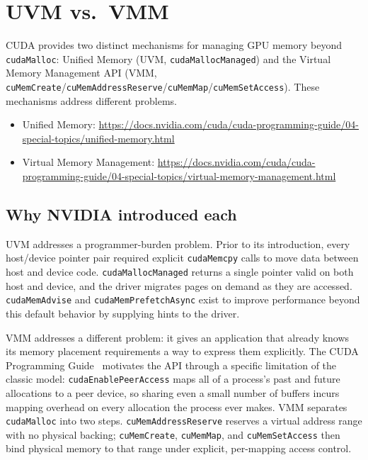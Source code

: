 \section{UVM vs.\ VMM}
\label{sec:uvm-vs-vmm}

CUDA provides two distinct mechanisms for managing GPU memory beyond
\texttt{cudaMalloc}: Unified Memory (UVM, \texttt{cudaMallocManaged}) and the
Virtual Memory Management API (VMM,
\texttt{cuMemCreate}/\texttt{cuMemAddressReserve}/\texttt{cuMemMap}/\texttt{cuMemSetAccess}).
These mechanisms address different problems.

\begin{itemize}
  \item Unified Memory:
    \url{https://docs.nvidia.com/cuda/cuda-programming-guide/04-special-topics/unified-memory.html}
  \item Virtual Memory Management:
    \url{https://docs.nvidia.com/cuda/cuda-programming-guide/04-special-topics/virtual-memory-management.html}
\end{itemize}

\subsection{Why NVIDIA introduced each}

UVM addresses a programmer-burden problem. Prior to its introduction, every
host/device pointer pair required explicit \texttt{cudaMemcpy} calls to move
data between host and device code. \texttt{cudaMallocManaged} returns a
single pointer valid on both host and device, and the driver migrates pages
on demand as they are accessed. \texttt{cudaMemAdvise} and
\texttt{cudaMemPrefetchAsync} exist to improve performance beyond this
default behavior by supplying hints to the driver.

VMM addresses a different problem: it gives an application that already
knows its memory placement requirements a way to express them explicitly.
The CUDA Programming Guide~\citep{cuda_programming_guide} motivates the API through a specific limitation
of the classic model: \texttt{cudaEnablePeerAccess} maps all of a process's
past and future allocations to a peer device, so sharing even a small number
of buffers incurs mapping overhead on every allocation the process ever
makes. VMM separates \texttt{cudaMalloc} into two steps.
\texttt{cuMemAddressReserve} reserves a virtual address range with no
physical backing; \texttt{cuMemCreate}, \texttt{cuMemMap}, and
\texttt{cuMemSetAccess} then bind physical memory to that range under
explicit, per-mapping access control.

